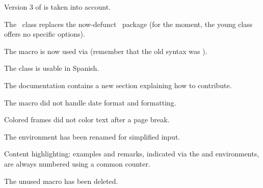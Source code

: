 \tdocsep




\begin{tdoctech}[version = 1.5.0, date = 2024-10-19]
    \item Version 3 of  is taken into account.
\end{tdoctech}


\begin{tdocbreak}
    \item The \thisproj\ class replaces the now-defunct \thisproj\ package (for the moment, the young class offers no specific options).

    \item The  macro is now used via  (remember that the old syntax was ).
\end{tdocbreak}


\begin{tdocnew}
    \item The class is usable in Spanish.

    \item The documentation contains a new section explaining how to contribute.
\end{tdocnew}


\begin{tdocfix}
    \item The  macro did not handle date format and formatting.

    \item Colored frames did not color text after a page break.
\end{tdocfix}

\tdocsep




\begin{tdocbreak}[version = 1.4.0, date = 2024-09-28]
    \item The  environment has been renamed  for simplified input.

    \item Content highlighting: examples and remarks, indicated via the  and  environments, are always numbered using a common counter.

    \item The unused macro  has been deleted.
\end{tdocbreak}


